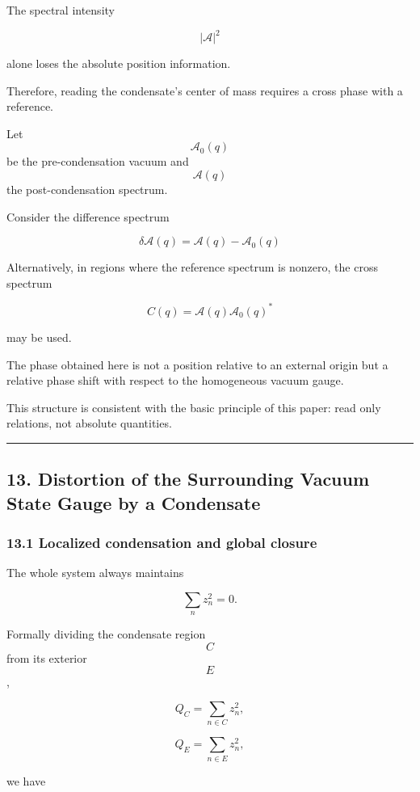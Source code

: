 \documentclass[
  a4paper,
]{article}
\begin{document}
The spectral intensity

\[
|\mathcal A|^2
\]

alone loses the absolute position information.

Therefore, reading the condensate's center of mass requires a cross
phase with a reference.

Let \[\mathcal A_0(q)\] be the pre-condensation vacuum and
\[\mathcal A(q)\] the post-condensation spectrum.

Consider the difference spectrum

\[
\boxed{
\delta\mathcal A(q)
=
\mathcal A(q)-\mathcal A_0(q)
}
\tag{36}
\]

Alternatively, in regions where the reference spectrum is nonzero, the
cross spectrum

\[
\boxed{
C(q)
=
\mathcal A(q)
\mathcal A_0(q)^*
}
\tag{37}
\]

may be used.

The phase obtained here is not a position relative to an external origin
but a relative phase shift with respect to the homogeneous vacuum gauge.

This structure is consistent with the basic principle of this paper:
read only relations, not absolute quantities.

\begin{center}\rule{0.5\linewidth}{0.5pt}\end{center}

\subsection{13. Distortion of the Surrounding Vacuum State Gauge by a
Condensate}\label{distortion-of-the-surrounding-vacuum-state-gauge-by-a-condensate}

\subsubsection{13.1 Localized condensation and global
closure}\label{localized-condensation-and-global-closure}

The whole system always maintains

\[
\sum_n z_n^2=0.
\]

Formally dividing the condensate region \[C\] from its exterior \[E\],

\[
Q_C
=
\sum_{n\in C}z_n^2,
\]

\[
Q_E
=
\sum_{n\in E}z_n^2,
\]

we have
\end{document}
